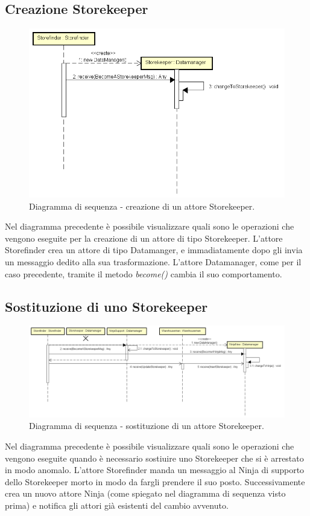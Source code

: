 \documentclass[a4paper]{article}
\begin{document}
         \subsection{Creazione Storekeeper}
            \begin{figure} [H]
				\centering
				\includegraphics[width=\textwidth]{ST/seq/CreazioneStorekeeper.png}
				\caption{Diagramma di sequenza - creazione di un attore Storekeeper.}
			\end{figure}
            Nel diagramma precedente è possibile visualizzare quali sono le operazioni che vengono eseguite per la creazione di un attore di tipo Storekeeper.
            L'attore Storefinder crea un attore di tipo Datamanger, e immadiatamente dopo gli invia un messaggio dedito alla sua trasformazione. L'attore 
            Datamanager, come per il caso precedente, tramite il metodo \textit{become()} cambia il suo comportamento.
            
         \subsection{Sostituzione di uno Storekeeper}
            \begin{figure} [H]
				\centering
				\includegraphics[width=\textwidth]{ST/seq/SostituzioneStorekeeper.png}
				\caption{Diagramma di sequenza - sostituzione di un attore Storekeeper.}
			\end{figure}
            Nel diagramma precedente è possibile visualizzare quali sono le operazioni che vengono eseguite quando è necessario sostiuire uno Storekeeper che 
            si è arrestato in modo anomalo. L'attore Storefinder manda un messaggio al Ninja di supporto dello Storekeeper morto in modo da fargli prendere il 
            suo posto. Successivamente crea un nuovo attore Ninja (come spiegato nel diagramma di sequenza visto prima) e notifica gli attori già esistenti del 
            cambio avvenuto.
            
\end{document}
